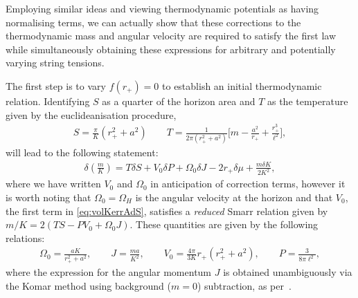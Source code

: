 \documentclass[
twoside,
openright,
frontopenright,
]{dmathesis}
\begin{document}
Employing similar ideas and viewing thermodynamic potentials as having
normalising terms, we can actually show that these corrections to the
thermodynamic mass and angular velocity are required to satisfy the first law
while simultaneously obtaining these expressions for arbitrary and potentially
varying string tensions.

The first step is to vary $f(r_+)=0$ to establish an initial thermodynamic
relation. Identifying $S$ as a quarter of the horizon area and $T$ as the
temperature given by the euclideanisation procedure,
\begin{align} \label{eq:SandT-al}
S = \frac{\pi}{K}(r_+^2+a^2) \qquad
  T=\frac{1}{2\pi(r_{+}^{2}+a^{2})}
  \bigg[m-\frac{a^{2}}{r_{+}}+\frac{r_{+}^{3}}{\ell^{2}}\bigg], 
\end{align}
will lead to the following statement:
\begin{align}\label{eq:master-al}
\delta\left(\frac{m}{K}\right)=T\delta S +V_0\delta P + \Omega_0\delta J -
  2r_+\delta\mu + \frac{m\delta K}{2K^2},
\end{align}
where we have written $V_0$ and $\Omega_0$ in anticipation of correction terms,
however it is worth noting that $\Omega_0=\Omega_H$ is the angular velocity at
the horizon and that $V_0$, the first term in \cref{eq:volKerrAdS}, satisfies a
\emph{reduced} Smarr relation given by $m/K = 2(TS-PV_0+\Omega_0 J)$. These
quantities are given by the following relations:
\begin{align} \label{eq:horpotentials-al}
\Omega_0 =  \frac{a K}{r_{+}^{2}+a^{2}}, \qquad J=\frac{ma}{K^2}, \qquad V_0 =
  \frac{4\pi}{3K}r_+(r_+^2+a^2), \qquad P = \frac{3}{8\pi\ell^2}, 
\end{align}
where the expression for the angular momentum $J$ is obtained unambiguously via
the Komar method using background ($m=0$) subtraction, as
per~\cite{Magnon:1985sc}.
\end{document}
